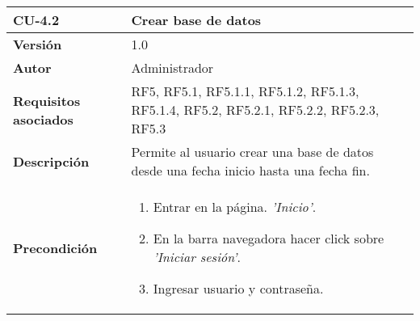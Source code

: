 \begin{table}[h!]
	\centering
	\begin{tabularx}{\linewidth}{ p{} p{} }
		\toprule
		\textbf{CU-4.2}    & \textbf{Crear base de datos}\\
		\toprule
		\textbf{Versión}              & 1.0    \\
		\textbf{Autor}                & Administrador \\
		\textbf{Requisitos asociados} & RF5, RF5.1, RF5.1.1, RF5.1.2, RF5.1.3, RF5.1.4, RF5.2, RF5.2.1, RF5.2.2, RF5.2.3, RF5.3\\
		\textbf{Descripción}          & Permite al usuario crear una base de datos desde una fecha inicio hasta una fecha fin.\\
        \textbf{Precondición}         &  
  	\begin{enumerate}
			\def\labelenumi{\arabic{enumi}.}
			\tightlist
			\item Entrar en la página. \textit{'Inicio'}.
			\item En la barra navegadora hacer click sobre \textit{'Iniciar sesión'}.
            \item Ingresar usuario y contraseña.


\end{enumerate}
\end{tabularx}
\end{table}

